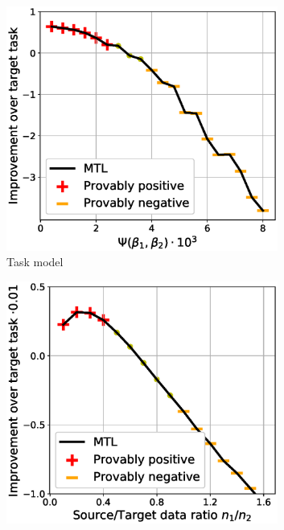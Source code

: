 \begin{figure}
	\begin{subfigure}[b]{0.32\textwidth}
		\centering
		\includegraphics[width=0.98\textwidth]{figures/model_shift_phase_transition.eps}
		\caption{Task model}
		\label{fig_model_shift}
	\end{subfigure}\hfill
	\begin{subfigure}[b]{0.32\textwidth}
		\centering
		\includegraphics[width=0.98\textwidth]{figures/datapoints_phase_transition.eps}

\end{subfigure}
\end{figure}
